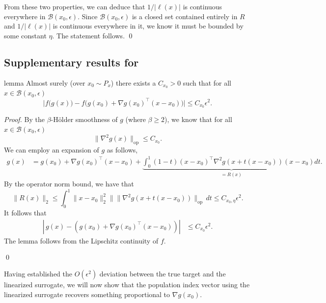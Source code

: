 \documentclass[11pt]{article}
\begin{document}
\begin{appendices}
From these two properties, we can deduce that $1/|\ell(x)|$ is continuous everywhere in $\mathcal{B}(x_0,\epsilon)$. Since $\mathcal{B}(x_0,\epsilon)$ is a closed set contained entirely in $R$ and $1/|\ell(x)|$ is continuous everywhere in it, we know it must be bounded by some constant $\eta$. The statement follows. \qed{}


\subsection{Supplementary results for }

\begin{restatable}[Approximation]{lemma}{} \label{lemma: proj approx general}
    Almost surely (over $x_0 \sim P_x$) there exists a $C_{x_0} > 0$ such that for all $x \in \mathcal{B}(x_0, \epsilon)$ 
    \[\bigg|f\big(g(x)\big) - f\big(g(x_0) + \nabla g(x_0)^{\top}(x-x_0) \big)\bigg| \le C_{x_0}\epsilon^2. \]
\end{restatable}

\noindent \textit{Proof.} By the $\beta$-H\"older smoothness of $g$ (where $\beta \geq 2$), we know that for all $x \in \mathcal{B}(x_0, \epsilon)$
\[\|\nabla^2g(x)\|_{\operatorname{op}} \leq C_{x_0}.\]
We can employ an expansion of $g$ as follows,
\begin{align*}
    g(x) &= g(x_0) + \nabla g(x_0)^{\top}(x-x_0) + \underbrace{\int_{0}^{1}(1-t)(x-x_0)^{\top}\nabla^2g(x+t(x-x_0))(x-x_0) dt}_{= R(x)}.
\end{align*}
By the operator norm bound, we have that
\[\|R(x)\|_2 \leq \int_{0}^{1}\|x - x_0\|_2^2\|\|\nabla^2g(x+t(x-x_0))\|_{\operatorname{op}} \,dt \leq C_{x_0, \eta}\epsilon^2.\]
It follows that 
\begin{align}
    \left|\,g(x) - \left(g(x_0) + \nabla g(x_0)^{\top}(x-x_0)\right)\right| &\leq C_{x_0}\epsilon^2. \label{projection second order bound}
\end{align}
The lemma follows from the Lipschitz continuity of $f$. 

\qed{}

Having established the $O(\epsilon^2)$ deviation between the true target and the linearized surrogate, we will now show that the population index vector using the linearized surrogate recovers something proportional to $\nabla g(x_0)$.  


\end{appendices}
\end{document}
